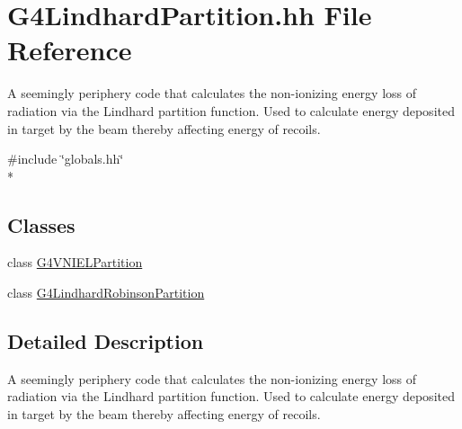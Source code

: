 \hypertarget{G4LindhardPartition_8hh}{\section{G4\-Lindhard\-Partition.\-hh File Reference}
\label{G4LindhardPartition_8hh}
}


A seemingly periphery code that calculates the non-\/ionizing energy loss of radiation via the Lindhard partition function. Used to calculate energy deposited in target by the beam thereby affecting energy of recoils.  


{\ttfamily \#include \char`\"{}globals.\-hh\char`\"{}}\\*
\subsection*{Classes}
\begin{DoxyCompactItemize}
\item 
class \hyperlink{classG4VNIELPartition}{G4\-V\-N\-I\-E\-L\-Partition}
\item 
class \hyperlink{classG4LindhardRobinsonPartition}{G4\-Lindhard\-Robinson\-Partition}
\end{DoxyCompactItemize}


\subsection{Detailed Description}
A seemingly periphery code that calculates the non-\/ionizing energy loss of radiation via the Lindhard partition function. Used to calculate energy deposited in target by the beam thereby affecting energy of recoils. 